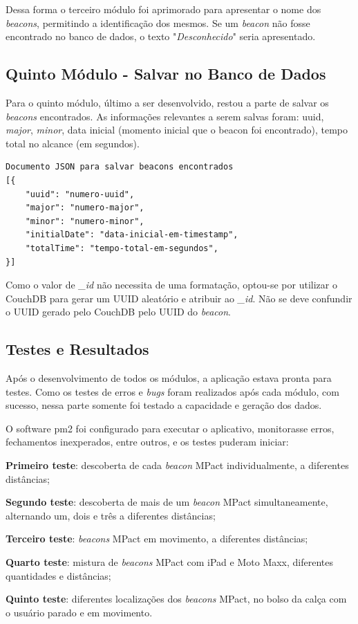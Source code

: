 Dessa forma o terceiro módulo foi aprimorado para apresentar o nome dos \textit{beacons}, permitindo a identificação dos mesmos. Se um \textit{beacon} não fosse encontrado no banco de dados, o texto "\textit{Desconhecido}" seria apresentado.

\subsection{Quinto Módulo - Salvar no Banco de Dados}\label{sec:quinto-modulo}

Para o quinto módulo, último a ser desenvolvido, restou a parte de salvar os \textit{beacons} encontrados. As informações relevantes a serem salvas foram: uuid, \textit{major}, \textit{minor}, data inicial (momento inicial que o beacon foi encontrado), tempo total no alcance (em segundos). 

\begin{verbatim}
Documento JSON para salvar beacons encontrados
[{
    "uuid": "numero-uuid",
    "major": "numero-major",
    "minor": "numero-minor",
    "initialDate": "data-inicial-em-timestamp",
    "totalTime": "tempo-total-em-segundos",
}]
\end{verbatim}

Como o valor de \textit{\_id} não necessita de uma formatação, optou-se por utilizar o CouchDB para gerar um UUID aleatório e atribuir ao \textit{\_id}. Não se deve confundir o UUID gerado pelo CouchDB pelo UUID do \textit{beacon}.

\subsection{Testes e Resultados}\label{sec:testes-resultados}

Após o desenvolvimento de todos os módulos, a aplicação estava pronta para testes. Como os testes de erros e \textit{bugs} foram realizados após cada módulo, com sucesso, nessa parte somente foi testado a capacidade e geração dos dados.

O software pm2 foi configurado para executar o aplicativo, monitorasse erros, fechamentos inexperados, entre outros, e os testes puderam iniciar:

\begin{alineas}
	\item \textbf{Primeiro teste}: descoberta de cada \textit{beacon} MPact individualmente, a diferentes distâncias;
	\item \textbf{Segundo teste}: descoberta de mais de um \textit{beacon} MPact simultaneamente, alternando um, dois e três a diferentes distâncias;
	\item \textbf{Terceiro teste}: \textit{beacons} MPact em movimento, a diferentes distâncias;
	\item \textbf{Quarto teste}: mistura de \textit{beacons} MPact com iPad e Moto Maxx, diferentes quantidades e distâncias;
	\item \textbf{Quinto teste}: diferentes localizações dos \textit{beacons} MPact, no bolso da calça com o usuário parado e em movimento.
\end{alineas}

